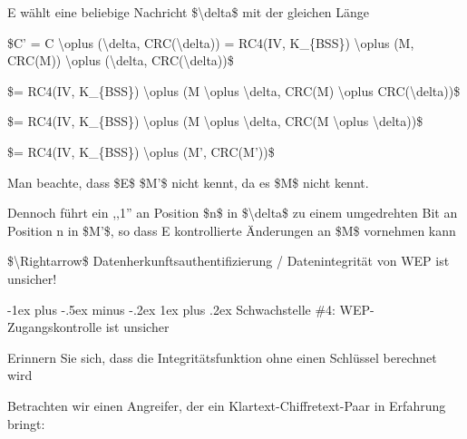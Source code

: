 \documentclass[a4paper]{article}
\makeatletter
\renewcommand{\subsubsection}{\@startsection{subsubsection}{3}{0mm}%
 {-1ex plus -.5ex minus -.2ex}%
 {1ex plus .2ex}%
 {\normalfont\small\bfseries}}
\makeatother
\begin{document}
\begin{multicols}{3}
\begin{itemize*}
            \begin{itemize*}
                  \item E wählt eine beliebige Nachricht \$\textbackslash delta\$ mit der gleichen Länge
                  \item \$C' = C \textbackslash oplus (\textbackslash delta, CRC(\textbackslash delta)) = RC4(IV, K\_\{BSS\}) \textbackslash oplus (M, CRC(M)) \textbackslash oplus (\textbackslash delta, CRC(\textbackslash delta))\$
                  \item \$= RC4(IV, K\_\{BSS\}) \textbackslash oplus (M \textbackslash oplus \textbackslash delta, CRC(M) \textbackslash oplus CRC(\textbackslash delta))\$
                  \item \$= RC4(IV, K\_\{BSS\}) \textbackslash oplus (M \textbackslash oplus \textbackslash delta, CRC(M \textbackslash oplus \textbackslash delta))\$
                  \item \$= RC4(IV, K\_\{BSS\}) \textbackslash oplus (M', CRC(M'))\$
                  \item Man beachte, dass \$E\$ \$M'\$ nicht kennt, da es \$M\$ nicht kennt.
                  \item Dennoch führt ein ,,1'' an Position \$n\$ in \$\textbackslash delta\$ zu einem umgedrehten Bit an Position n in \$M'\$, so dass E kontrollierte Änderungen an \$M\$ vornehmen kann
                  \item \$\textbackslash Rightarrow\$ Datenherkunftsauthentifizierung / Datenintegrität von WEP ist unsicher!
            \end{itemize*}
      \end{itemize*}


      \subsubsection{Schwachstelle \#4: WEP-Zugangskontrolle ist
            unsicher}

      \begin{itemize*}
            \item
            Erinnern Sie sich, dass die Integritätsfunktion ohne einen Schlüssel
            berechnet wird
            \item
            Betrachten wir einen Angreifer, der ein Klartext-Chiffretext-Paar in
            Erfahrung bringt:


\end{itemize*}
\end{multicols}
\end{document}

